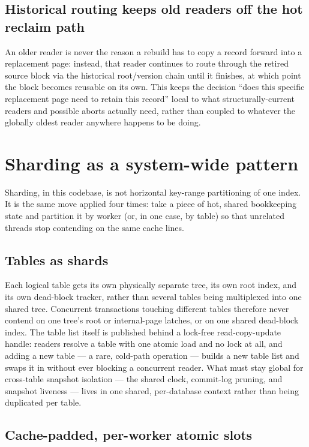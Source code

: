 \documentclass[11pt]{article}
\begin{document}
\subsection{Historical routing keeps old readers off the hot reclaim path}

An older reader is never the reason a rebuild has to copy a record forward into a
replacement page: instead, that reader continues to route through the retired
source block via the historical root/version chain until it finishes, at which
point the block becomes reusable on its own. This keeps the decision ``does this
specific replacement page need to retain this record'' local to what
structurally-current readers and possible aborts actually need, rather than coupled
to whatever the globally oldest reader anywhere happens to be doing.

\section{Sharding as a system-wide pattern}
\label{sec:sharding}

Sharding, in this codebase, is not horizontal key-range partitioning of one index.
It is the same move applied four times: take a piece of hot, shared bookkeeping
state and partition it by worker (or, in one case, by table) so that unrelated
threads stop contending on the same cache lines.

\subsection{Tables as shards}

Each logical table gets its own physically separate tree, its own root index, and
its own dead-block tracker, rather than several tables being multiplexed into one
shared tree. Concurrent transactions touching different tables therefore never
contend on one tree's root or internal-page latches, or on one shared dead-block
index. The table list itself is published behind a lock-free read-copy-update
handle: readers resolve a table with one atomic load and no lock at all, and adding
a new table --- a rare, cold-path operation --- builds a new table list and swaps it
in without ever blocking a concurrent reader. What must stay global for
cross-table snapshot isolation --- the shared clock, commit-log pruning, and
snapshot liveness --- lives in one shared, per-database context rather than being
duplicated per table.

\subsection{Cache-padded, per-worker atomic slots}
\end{document}
